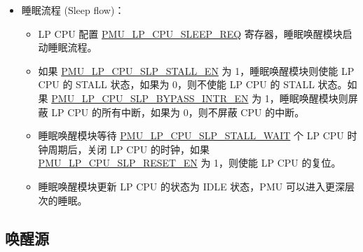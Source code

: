 \documentclass[main\_\_CN.tex]{subfiles}
\begin{document}
\begin{itemize}
    \item 睡眠流程 (Sleep flow)：
    \begin{itemize}
    \item LP CPU 配置 \hyperref[fielddesc:PMULPCPUSLEEPREQ]{PMU\_LP\_CPU\_SLEEP\_REQ} 寄存器，睡眠唤醒模块启动睡眠流程。
    \item 如果 \hyperref[fielddesc:PMULPCPUSLPSTALLEN]{PMU\_LP\_CPU\_SLP\_STALL\_EN} 为 1，睡眠唤醒模块则使能 LP CPU 的 STALL 状态，如果为 0，则不使能 LP CPU 的 STALL 状态。如果 \hyperref[fielddesc:PMULPCPUSLPBYPASSINTREN]{PMU\_LP\_CPU\_SLP\_BYPASS\_INTR\_EN} 为 1，睡眠唤醒模块则屏蔽 LP CPU 的所有中断，如果为 0，则不屏蔽 CPU 的中断。
    \item 睡眠唤醒模块等待 \hyperref[fielddesc:PMULPCPUSLPSTALLWAIT]{PMU\_LP\_CPU\_SLP\_STALL\_WAIT} 个 LP CPU 时钟周期后，关闭 LP CPU 的时钟，如果 \hyperref[fielddesc:PMULPCPUSLPRESETEN]{PMU\_LP\_CPU\_SLP\_RESET\_EN} 为 1，则使能 LP CPU 的复位。
    \item 睡眠唤醒模块更新 LP CPU 的状态为 IDLE 状态，PMU 可以进入更深层次的睡眠。
   \end{itemize}
   \end{itemize}

\subsection{唤醒源}
\end{document}
